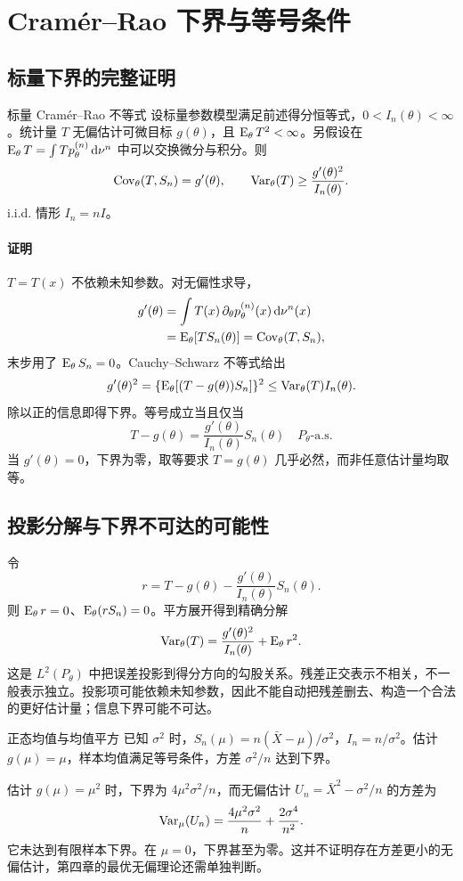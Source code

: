 \section{Cramér--Rao 下界与等号条件}

\subsection{标量下界的完整证明}
\begin{definitionbox}{标量 Cramér--Rao 不等式}
设标量参数模型满足前述得分恒等式，$0<I_n(\theta)<\infty$。统计量 $T$ 无偏估计可微目标 $g(\theta)$，且 $\operatorname{E}_\theta T^2<\infty$。另假设在 $\operatorname{E}_\theta T=\int T p_\theta^{(n)}\,\mathrm d\nu^n$ 中可以交换微分与积分。则
\[
 \operatorname{Cov}_\theta(T,S_n)=g'(\theta),\qquad
 \operatorname{Var}_\theta(T)\ge\frac{g'(\theta)^2}{I_n(\theta)}.
\]
i.i.d. 情形 $I_n=nI$。
\end{definitionbox}

\paragraph{证明}
$T=T(x)$ 不依赖未知参数。对无偏性求导，
\[
 \begin{aligned}
 g'(\theta)
 &=\int T(x)\,\partial_\theta p_\theta^{(n)}(x)\,\mathrm d\nu^n(x)\\
 &=\operatorname{E}_\theta[T S_n(\theta)]
 =\operatorname{Cov}_\theta(T,S_n),
 \end{aligned}
\]
末步用了 $\operatorname{E}_\theta S_n=0$。Cauchy--Schwarz 不等式给出
\[
 g'(\theta)^2
 =\{\operatorname{E}_\theta[(T-g(\theta))S_n]\}^2
 \le\operatorname{Var}_\theta(T)I_n(\theta).
\]
除以正的信息即得下界。等号成立当且仅当
\[
 T-g(\theta)=\frac{g'(\theta)}{I_n(\theta)}S_n(\theta)
 \quad P_\theta\text{-a.s.}
\]
当 $g'(\theta)=0$，下界为零，取等要求 $T=g(\theta)$ 几乎必然，而非任意估计量均取等。

\subsection{投影分解与下界不可达的可能性}
令
\[
 r=T-g(\theta)-\frac{g'(\theta)}{I_n(\theta)}S_n(\theta).
\]
则 $\operatorname{E}_\theta r=0$、$\operatorname{E}_\theta(rS_n)=0$。平方展开得到精确分解
\[
 \operatorname{Var}_\theta(T)=\frac{g'(\theta)^2}{I_n(\theta)}+\operatorname{E}_\theta r^2.
\]
这是 $L^2(P_\theta)$ 中把误差投影到得分方向的勾股关系。残差正交表示不相关，不一般表示独立。投影项可能依赖未知参数，因此不能自动把残差删去、构造一个合法的更好估计量；信息下界可能不可达。

\begin{examplebox}{正态均值与均值平方}
已知 $\sigma^2$ 时，$S_n(\mu)=n(\bar X-\mu)/\sigma^2$，$I_n=n/\sigma^2$。估计 $g(\mu)=\mu$，样本均值满足等号条件，方差 $\sigma^2/n$ 达到下界。

估计 $g(\mu)=\mu^2$ 时，下界为 $4\mu^2\sigma^2/n$，而无偏估计 $U_n=\bar X^2-\sigma^2/n$ 的方差为
\[
 \operatorname{Var}_\mu(U_n)=\frac{4\mu^2\sigma^2}{n}+\frac{2\sigma^4}{n^2}.
\]
它未达到有限样本下界。在 $\mu=0$，下界甚至为零。这并不证明存在方差更小的无偏估计，第四章的最优无偏理论还需单独判断。
\end{examplebox}

